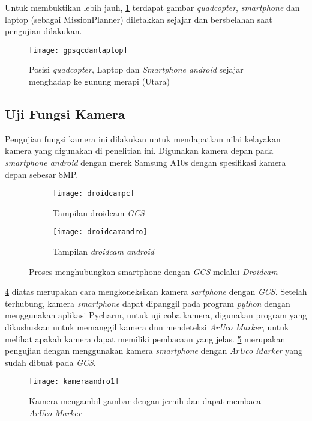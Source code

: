 Untuk membuktikan lebih jauh, \cref{fig:gpsqcdanlaptop} terdapat gambar \textit{quadcopter}, \textit{smartphone} dan laptop (sebagai MissionPlanner) diletakkan sejajar dan bersbelahan saat pengujian dilakukan.

\begin{figure}[H]
	\centering
	\texttt{[image: gpsqcdanlaptop]}
	\caption{Posisi \textit{quadcopter}, Laptop dan \textit{Smartphone android} sejajar menghadap ke gunung merapi (Utara)}
	\label{fig:gpsqcdanlaptop}
\end{figure}

\subsection{Uji Fungsi Kamera}
Pengujian fungsi kamera ini dilakukan untuk mendapatkan nilai kelayakan kamera yang digunakan di penelitian ini. Digunakan kamera depan pada \textit{smartphone android} dengan merek Samsung A10s dengan spesifikasi kamera depan sebesar 8MP.

\begin{figure}
	\centering
	\begin{subfigure}[b]{1\textwidth}
		\centering
		\texttt{[image: droidcampc]}
		\caption{Tampilan droidcam \textit{GCS}}
		\label{fig:droidcampc}
	\end{subfigure}
	\hfill
	\begin{subfigure}[b]{1\textwidth}
		\centering
		\texttt{[image: droidcamandro]}
		\caption{Tampilan \textit{droidcam android}}
		\label{fig:droidcamandro}
	\end{subfigure}
	\caption{Proses menghubungkan smartphone dengan \textit{GCS} melalui \textit{Droidcam}}
	\label{fig:droidcamandropc}
\end{figure}

\cref{fig:droidcamandropc} diatas merupakan cara mengkoneksikan kamera \textit{sartphone} dengan \textit{GCS}. Setelah terhubung, kamera \textit{smartphone} dapat dipanggil pada program \textit{python} dengan menggunakan aplikasi Pycharm, untuk uji coba kamera, digunakan program yang dikushuskan untuk memanggil kamera dnn mendeteksi \textit{ArUco Marker}, untuk melihat apakah kamera dapat memiliki pembacaan yang jelas. \cref{fig:kameraandro1} merupakan pengujian dengan menggunakan kamera \textit{smartphone} dengan \textit{ArUco Marker} yang sudah dibuat pada \textit{GCS}.

\begin{figure}[H]
	\centering
	\texttt{[image: kameraandro1]}
	\caption{Kamera mengambil gambar dengan jernih dan dapat membaca \textit{ArUco Marker}}
	\label{fig:kameraandro1}
\end{figure}


